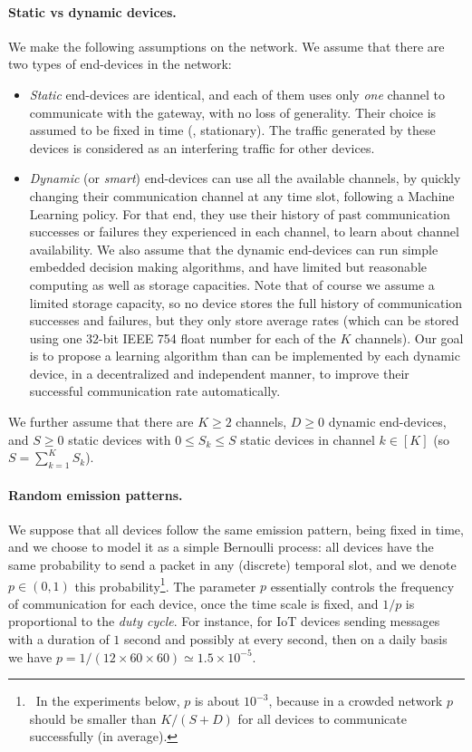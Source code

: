 \paragraph{Static vs dynamic devices.}
%
We make the following assumptions on the network.
We assume that there are two types of end-devices in the network:
\begin{itemize}
    \item
    \emph{Static} end-devices are identical, and each of them uses only \emph{one} channel to communicate with the gateway, with no loss of generality.
    Their choice is assumed to be fixed in time (\ie, stationary). The traffic generated by these devices is considered as an interfering traffic for other devices.
    \item
    \emph{Dynamic} (or \emph{smart}) end-devices can use all the available channels, by quickly changing their communication channel at any time slot, following a Machine Learning policy.
    For that end, they use their history of past communication successes or failures they experienced in each channel, to learn about channel availability.
    We also assume that the dynamic end-devices can run simple embedded decision making algorithms, and have limited but reasonable computing as well as storage capacities.
    Note that of course we assume a limited storage capacity, so no device stores the full history of communication successes and failures, but they only store average rates (which can be stored using one $32$-bit IEEE 754 float number for each of the $K$ channels).
    Our goal is to propose a learning algorithm than can be implemented by each dynamic device, in a decentralized and independent manner, to improve their successful communication rate automatically.
\end{itemize}

We further assume that there are $K \geq 2$ channels, $D \geq 0$ dynamic end-devices, and $S \geq 0$ static devices
with $0 \leq S_k \leq S$ static devices in channel $k \in [K]$ (so $S = \sum_{k=1}^{K} S_k$).


\paragraph{Random emission patterns.}
%
We suppose that all devices follow the same emission pattern, being fixed in time, and we choose to model it as a simple Bernoulli process:
all devices have the same probability to send a packet in any (discrete) temporal slot, and we denote $p \in (0, 1)$ this probability\footnote{~In the experiments below, $p$ is about $10^{-3}$, because in a crowded network $p$ should be smaller than $K / (S + D)$ for all devices to communicate successfully (in average).}.
The parameter $p$ essentially controls the frequency of communication for each device, once the time scale is fixed, and $1/p$ is proportional to the \emph{duty cycle}.
For instance, for IoT devices sending messages with a duration of $1$ second and possibly at every second, then on a daily basis we have $p = 1 / (12 \times 60 \times 60) \simeq 1.5 \times 10^{-5}$.

